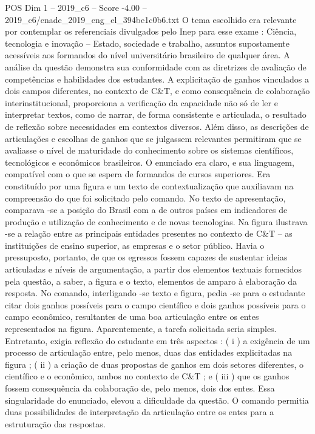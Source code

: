 \begin{textsample}{POS Dim 1 – 2019\_c6 – Score -4.00 – 2019\_c6/enade\_2019\_eng\_el\_394be1c0b6.txt}
O tema escolhido era relevante por contemplar os referenciais divulgados pelo Inep para esse exame : Ciência, tecnologia e inovação – Estado, sociedade e trabalho, assuntos supostamente acessíveis aos formandos do nível universitário brasileiro de qualquer área.
A análise da questão demonstra sua conformidade com as diretrizes de avaliação de competências e habilidades dos estudantes.
A explicitação de ganhos vinculados a dois campos diferentes, no contexto de C\&T, e como consequência de colaboração interinstitucional, proporciona a verificação da capacidade não só de ler e interpretar textos, como de narrar, de forma consistente e articulada, o resultado de reflexão sobre necessidades em contextos diversos.
Além disso, as descrições de articulações e escolhas de ganhos que se julgassem relevantes permitiram que se avaliasse o nível de maturidade do conhecimento sobre os sistemas científicos, tecnológicos e econômicos brasileiros.
O enunciado era claro, e sua linguagem, compatível com o que se espera de formandos de cursos superiores.
Era constituído por uma figura e um texto de contextualização que auxiliavam na compreensão do que foi solicitado pelo comando.
No texto de apresentação, comparava -se a posição do Brasil com a de outros países em indicadores de produção e utilização de conhecimento e de novas tecnologias.
Na figura ilustrava -se a relação entre as principais entidades presentes no contexto de C\&T – as instituições de ensino superior, as empresas e o setor público.
Havia o pressuposto, portanto, de que os egressos fossem capazes de sustentar ideias articuladas e níveis de argumentação, a partir dos elementos textuais fornecidos pela questão, a saber, a figura e o texto, elementos de amparo à elaboração da resposta.
No comando, interligando -se texto e figura, pedia -se para o estudante citar dois ganhos possíveis para o campo científico e dois ganhos possíveis para o campo econômico, resultantes de uma boa articulação entre os entes representados na figura.
Aparentemente, a tarefa solicitada seria simples.
Entretanto, exigia reflexão do estudante em três aspectos : ( i ) a exigência de um processo de articulação entre, pelo menos, duas das entidades explicitadas na figura ; ( ii ) a criação de duas propostas de ganhos em dois setores diferentes, o científico e o econômico, ambos no contexto de C\&T ; e ( iii ) que os ganhos fossem consequência da colaboração de, pelo menos, dois dos entes.
Essa singularidade do enunciado, elevou a dificuldade da questão.
O comando permitia duas possibilidades de interpretação da articulação entre os entes para a estruturação das respostas.

\end{textsample}
